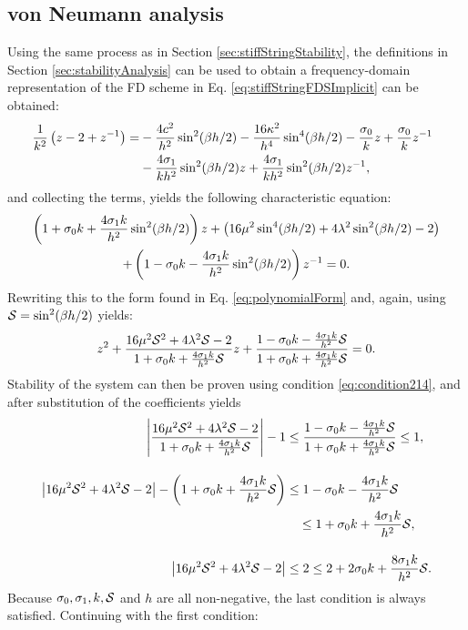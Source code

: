 {\subsection{von Neumann analysis}
Using the same process as in Section \ref{sec:stiffStringStability}, the definitions in Section \ref{sec:stabilityAnalysis} can be used to obtain a frequency-domain representation of the FD scheme in Eq. \eqref{eq:stiffStringFDSImplicit} can be obtained:
\begin{align}
    \!\!\!\!\frac{1}{k^2}\left(z - 2 + z^{-1}\right) =&-\frac{4c^2}{h^2}\sin^2(\beta h/2) - \frac{16\kappa^2}{h^4}\sin^4(\beta h/2) - \frac{\sz}{k}z + \frac{\sz}{k} z^{-1}\nonumber\\
    & - \frac{4 \so}{kh^2}\sin^2(\beta h/2)z + \frac{4 \so}{kh^2} \sin^2(\beta h/2)z^{-1},
\end{align}
and collecting the terms, yields the following characteristic equation:
\begin{gather}
\left(1+\sz k + \frac{4\so k}{h^2}\sin^2(\beta h/2)\right)z + \left(16\mu^2\sin^4(\beta h/2)+4\lambda^2\sin^2(\beta h/2) - 2\right)\nonumber\\
+ \left(1-\sz k - \frac{4\so k}{h^2}\sin^2(\beta h/2)\right)z^{-1} = 0.\label{eq:charDampedStiffSTring}
\end{gather}
Rewriting this to the form found in Eq. \eqref{eq:polynomialForm} and, again, using $\S = \sin^2(\beta h / 2)$ yields:
\begin{equation*}
z^2 + \frac{16\mu^2\S^2+4\lambda^2\S - 2}{1+\sz k + \frac{4\so k}{h^2}\S}z+\frac{1-\sz k - \frac{4\so k}{h^2}\S}{1+\sz k + \frac{4\so k}{h^2}\S} = 0.
\end{equation*}
Stability of the system can then be proven using condition \eqref{eq:condition214}, and after substitution of the coefficients yields
\begin{align*}
\left|\frac{16\mu^2\S^2+4\lambda^2\S - 2}{1+\sz k + \frac{4\so k}{h^2}\S} \right|-1 &\leq \frac{1-\sz k - \frac{4\so k}{h^2}\S}{1+\sz k + \frac{4\so k}{h^2}\S}\leq 1,\\[1em]
\left|16\mu^2\S^2+4\lambda^2\S - 2 \right| - \left(1+\sz k + \frac{4\so k}{h^2}\S\right) &\leq 1-\sz k - \frac{4\so k}{h^2}\S\\
&\quad\leq 1+\sz k + \frac{4\so k}{h^2}\S,\\[1em]
\left|16\mu^2\S^2+4\lambda^2\S - 2 \right|&\leq 2 \leq 2+2\sz k + \frac{8\so k}{h^2}\S.
\end{align*} 
Because $\sz, \so, k, \S$ and $h$ are all non-negative, the last condition is always satisfied. Continuing with the first condition:
}
